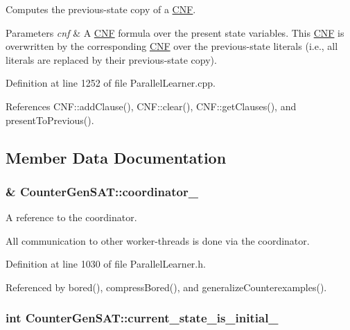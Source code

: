 Computes the previous-\/state copy of a \hyperlink{classCNF}{C\-N\-F}. 


\begin{DoxyParams}{Parameters}
{\em cnf} & A \hyperlink{classCNF}{C\-N\-F} formula over the present state variables. This \hyperlink{classCNF}{C\-N\-F} is overwritten by the corresponding \hyperlink{classCNF}{C\-N\-F} over the previous-\/state literals (i.\-e., all literals are replaced by their previous-\/state copy). \\
\hline
\end{DoxyParams}


Definition at line 1252 of file Parallel\-Learner.\-cpp.



References C\-N\-F\-::add\-Clause(), C\-N\-F\-::clear(), C\-N\-F\-::get\-Clauses(), and present\-To\-Previous().



\subsection{Member Data Documentation}
\hypertarget{classCounterGenSAT_a90c79c0fa427fcd2dacd760421f5afe4}{
\subsubsection[{coordinator\-\_\-}]{\& Counter\-Gen\-S\-A\-T\-::coordinator\-\_\-\hspace{0.3cm}{\ttfamily [protected]}}}\label{classCounterGenSAT_a90c79c0fa427fcd2dacd760421f5afe4}


A reference to the coordinator. 

All communication to other worker-\/threads is done via the coordinator. 

Definition at line 1030 of file Parallel\-Learner.\-h.



Referenced by bored(), compress\-Bored(), and generalize\-Counterexamples().

\hypertarget{classCounterGenSAT_a578a95e6b9eb1b1b19419c0acb3248fa}{
\subsubsection[{current\-\_\-state\-\_\-is\-\_\-initial\-\_\-}]{\setlength{\rightskip}{0pt plus 5cm}int Counter\-Gen\-S\-A\-T\-::current\-\_\-state\-\_\-is\-\_\-initial\-\_\-\hspace{0.3cm}{\ttfamily [protected]}}}\label{classCounterGenSAT_a578a95e6b9eb1b1b19419c0acb3248fa}


